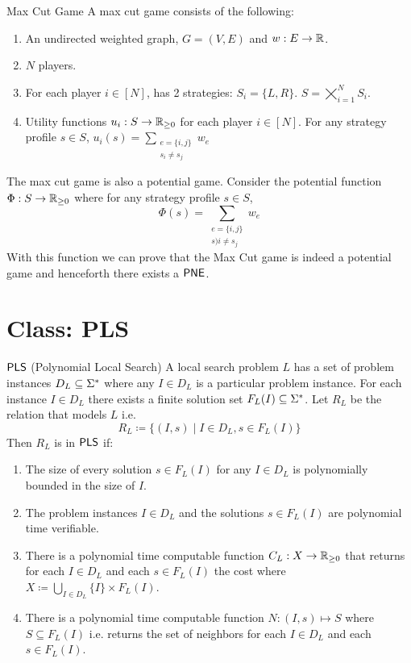 \begin{definition}{Max Cut Game}{}
	A max cut game consists of the following:
	\begin{enumerate}[itemsep=-1mm]
		\item An undirected weighted graph, $G=(V,E)$ and $w:E\to\mathbb{R}$.
		\item $N$ players.
		\item For each player $i\in[N]$, has 2 strategies: $S_i=\{L,R\}$. $S=\bigtimes\limits_{i=1}^N S_i$.	
		\item Utility functions $u_i:S\to \mathbb{R}_{\geq 0}$ for each player $i\in[N]$. For any strategy profile $s\in S$,  $u_i(s)=\sum\limits_{\substack{e=\{i,j\}\\ s_i\neq s_j}}w_e$
	\end{enumerate}
\end{definition}

The max cut game is also a potential game. Consider the potential function $\Phi:S\to\mathbb{R}_{\geq 0}$ where for any strategy profile $s\in S$, $$\Phi(s)=\sum_{\substack{e=\{i,j\}\\ s)i\neq s_j}}w_e$$With this function we can prove that the Max Cut game is indeed a potential game and henceforth there exists a $\operatorname{\mathsf{PNE}}$.
\section{Class: \textsf{PLS}}
\begin{definition}{$\operatorname{\mathsf{PLS}}$ (Polynomial Local Search)}{}
	A local search problem $L$ has a set of problem instances $D_L\subseteq \Sigma^*$ where any $I\in D_L$ is a particular problem instance. For each instance $I\in D_L$ there exists a finite solution set $F_L(I)\subseteq \Sigma^*$. Let $R_L$ be the relation that models $L$ i.e. $$R_L\coloneqq \{(I,s)\mid I\in D_L,s\in F_L(I)\}$$ Then $R_L$ is in $\operatorname{\mathsf{PLS}}$ if:\begin{enumerate}[label=(\roman*)]
		\item The size of every solution $s\in F_L(I)$ for any $I\in D_L$ is polynomially bounded in the size of $I$.
		\item The problem instances $I\in D_L$ and the solutions $s\in F_L(I)$ are polynomial time verifiable.
		\item There is a polynomial time computable function $C_L:X\to \mathbb{R}_{\geq 0}$ that returns for each $I\in D_L$ and each $s\in F_L(I)$ the cost where  $X\coloneqq \bigcup\limits_{I\in D_L}\{I\}\times F_L(I)$.
		\item There is a polynomial time computable function $N:(I,s)\mapsto S$ where $S\subseteq F_L(I)$ i.e. returns the set of neighbors for each $I\in D_L$ and each $s\in F_L(I)$.
	\end{enumerate}
\end{definition}

